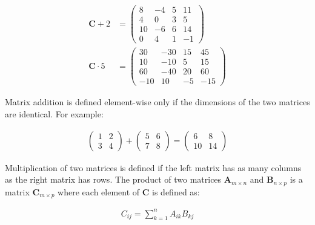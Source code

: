 \begin{align*}
\mathbf{C} + 2 &= \begin{pmatrix}8 & -4 & 5 & 11 \\
4 & 0 & 3 & 5 \\
10 & -6 & 6 & 14 \\
0 & 4 & 1 & -1 \end{pmatrix} \\ 
\mathbf{C} \cdot 5 &= \begin{pmatrix}30 & -30 & 15 & 45 \\
10 & -10 & 5 & 15 \\
60 & -40 & 20 & 60 \\
-10 & 10 & -5 & -15 \end{pmatrix}
\end{align*}

Matrix addition is defined element-wise only if the dimensions of the two matrices are identical. For example:

\begin{align*}
\begin{pmatrix}1 & 2 \\ 3 & 4\end{pmatrix} + \begin{pmatrix}5 & 6 \\ 7 & 8\end{pmatrix} = \begin{pmatrix}6 & 8 \\ 10 & 14\end{pmatrix}
\end{align*}

Multiplication of two matrices is defined if the left matrix has as many columns as the right matrix has rows. The product of two matrices $\mathbf{A}_{m \times n}$ and $\mathbf{B}_{n \times p}$ is a matrix $\mathbf{C}_{m \times p}$ where each element of $\mathbf{C}$ is defined as:

\begin{align*}
C_{ij} = \sum_{k=1}^n A_{ik} B_{kj}
\end{align*}

